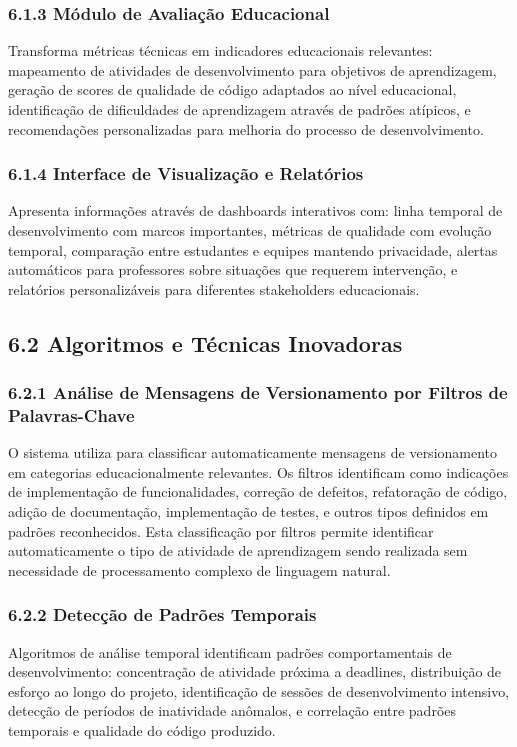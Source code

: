 \documentclass{patente}
\begin{document}
\subsubsection*{6.1.3 Módulo de Avaliação Educacional}
Transforma métricas técnicas em indicadores educacionais relevantes: mapeamento de atividades de desenvolvimento para objetivos de aprendizagem, geração de scores de qualidade de código adaptados ao nível educacional, identificação de dificuldades de aprendizagem através de padrões atípicos, e recomendações personalizadas para melhoria do processo de desenvolvimento.

\subsubsection*{6.1.4 Interface de Visualização e Relatórios}
Apresenta informações através de dashboards interativos com: linha temporal de desenvolvimento com marcos importantes, métricas de qualidade com evolução temporal, comparação entre estudantes e equipes mantendo privacidade, alertas automáticos para professores sobre situações que requerem intervenção, e relatórios personalizáveis para diferentes stakeholders educacionais.

\subsection*{6.2 Algoritmos e Técnicas Inovadoras}

\subsubsection*{6.2.1 Análise de Mensagens de Versionamento por Filtros de Palavras-Chave}
O sistema utiliza  para classificar automaticamente mensagens de versionamento em categorias educacionalmente relevantes. Os filtros identificam  como indicações de implementação de funcionalidades, correção de defeitos, refatoração de código, adição de documentação, implementação de testes, e outros tipos definidos em padrões reconhecidos. Esta classificação por filtros permite identificar automaticamente o tipo de atividade de aprendizagem sendo realizada sem necessidade de processamento complexo de linguagem natural.

\subsubsection*{6.2.2 Detecção de Padrões Temporais}
Algoritmos de análise temporal identificam padrões comportamentais de desenvolvimento: concentração de atividade próxima a deadlines, distribuição de esforço ao longo do projeto, identificação de sessões de desenvolvimento intensivo, detecção de períodos de inatividade anômalos, e correlação entre padrões temporais e qualidade do código produzido.
\end{document}
